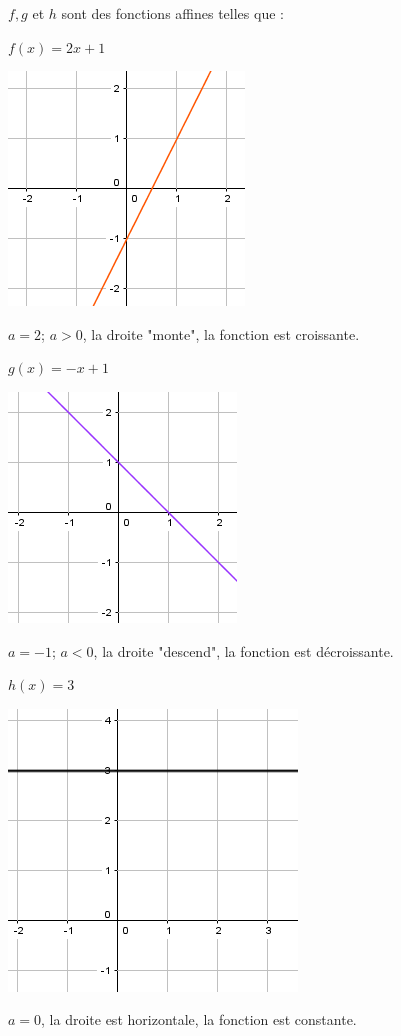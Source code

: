 \documentclass[12pt,a4paper]{article}
\begin{document}
\begin{myexs}
	$f, g$ et $h$ sont des fonctions affines telles que :
	
	\begin{multicols}{3}
		\begin{center}
			$f(x)=2x+1$
			
			\includegraphics[scale=0.6]{img/ex2_1}
			
			$a=2$; $a>0$, la droite "monte", la fonction est croissante. 
		\end{center}
		
		\begin{center}
			$g(x)=-x+1$
			
			\includegraphics[scale=0.6]{img/ex2_2}
			
			$a=-1$; $a<0$, la droite "descend", la fonction est décroissante. 
		\end{center}
			
		\begin{center}
			$h(x)=3$
				
				
			\includegraphics[scale=0.57]{img/ex2_3}
				
			$a=0$, la droite est horizontale, la fonction est constante. 
		\end{center}
	\end{multicols}
\end{myexs}
\end{document}
